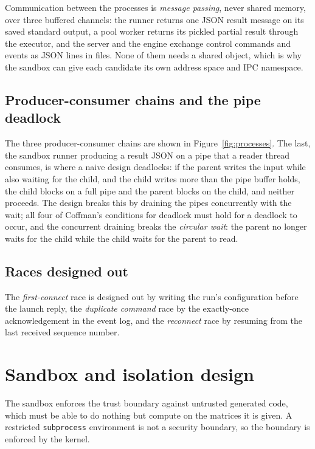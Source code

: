 Communication between the processes is \emph{message passing}, never shared
memory, over three buffered channels: the runner returns one JSON result message
on its saved standard output, a pool worker returns its pickled partial result
through the executor, and the server and the engine exchange control commands and
events as JSON lines in files. None of them needs a shared object, which is why
the sandbox can give each candidate its own address space and IPC namespace.

\subsection{Producer-consumer chains and the pipe deadlock}

The three producer-consumer chains are shown in Figure~\ref{fig:processes}. The
last, the sandbox runner producing a result JSON on a pipe that a reader thread
consumes, is where a naive design deadlocks: if the parent writes the input while
also waiting for the child, and the child writes more than the pipe buffer holds,
the child blocks on a full pipe and the parent blocks on the child, and neither
proceeds. The design breaks this by draining the pipes concurrently with the
wait; all four of Coffman's conditions for deadlock \citep{coffman1971deadlock}
must hold for a deadlock to occur, and the concurrent draining breaks the
\emph{circular wait}: the parent no longer waits for the child while the child
waits for the parent to read.

\subsection{Races designed out}

The \emph{first-connect} race is designed out by writing the run's configuration
before the launch reply, the \emph{duplicate command} race by the exactly-once
acknowledgement in the event log, and the \emph{reconnect} race by resuming from
the last received sequence number.

\section{Sandbox and isolation design}
\label{sec:design-sandbox}

The sandbox enforces the trust boundary against untrusted generated code, which
must be able to do nothing but compute on the matrices it is given. A restricted
\texttt{subprocess} environment is not a security boundary, so the boundary is
enforced by the kernel.

